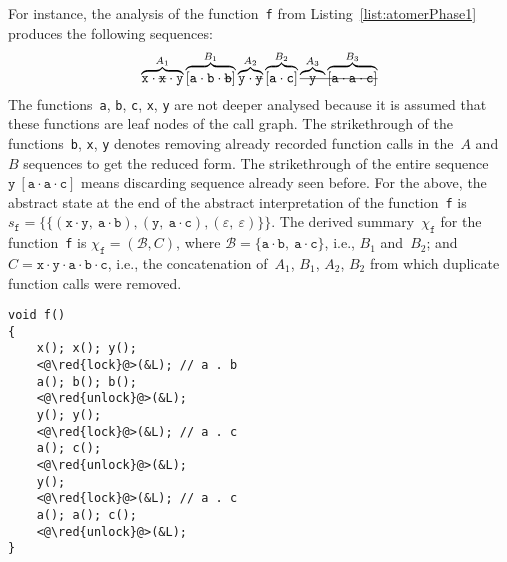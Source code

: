 \begin{example}
    For instance, the analysis of the function~\texttt{f} from Listing~\ref{list:atomerPhase1} produces the following sequences:
    $$
        \overbrace{\mathtt{x} \cdot \text{\texttt{\sout{x}}} \cdot \mathtt{y}}^{A_1} \overbrace{[\mathtt{a} \cdot \mathtt{b} \cdot \text{\texttt{\sout{b}}}]}^{B_1}
        \overbrace{\mathtt{y} \cdot \text{\texttt{\sout{y}}}}^{A_2} \overbrace{[\mathtt{a} \cdot \mathtt{c}]}^{B_2}
        \text{\sout{\ensuremath{\overbrace{\mathtt{y}}^{A_3} \overbrace{[\mathtt{a} \cdot \mathtt{a} \cdot \mathtt{c}]}^{B_3}}}}
    $$
    The functions~\texttt{a}, \texttt{b}, \texttt{c}, \texttt{x}, \texttt{y} are not deeper analysed because it is assumed that these functions are leaf nodes of the call graph. The strikethrough of the functions~\texttt{b}, \texttt{x}, \texttt{y} denotes removing already recorded function calls in the~$ A $ and~$ B $ sequences to get the reduced form. The strikethrough of the entire sequence $ \mathtt{y}\ [\mathtt{a} \cdot \mathtt{a} \cdot \mathtt{c}] $ means discarding sequence already seen before. For the above, the abstract state at the end of the abstract interpretation of the function~\texttt{f} is $ s_\mathtt{f} = \{\{(\mathtt{x} \cdot \mathtt{y},\ \mathtt{a} \cdot \mathtt{b}), (\mathtt{y},\ \mathtt{a} \cdot \mathtt{c}), (\varepsilon,\ \varepsilon)\}\} $. The derived summary~$ \chi_\mathtt{f} $ for the function~\texttt{f} is $ \chi_\mathtt{f} = (\mathcal{B}, C) $, where $ \mathcal{B} = \{\mathtt{a} \cdot \mathtt{b},\ \mathtt{a} \cdot \mathtt{c}\} $, i.e., $ B_1 $ and~$ B_2 $; and $ C = \mathtt{x} \cdot \mathtt{y} \cdot \mathtt{a} \cdot \mathtt{b} \cdot \mathtt{c} $, i.e., the concatenation of~$ A_1 $, $ B_1 $, $ A_2 $, $ B_2 $ from which duplicate function calls were removed.
\end{example}

\begin{lstlisting}[style=c, label={list:atomerPhase1}, float=hbt, caption={A~code snippet used for an illustration of the derivation of \emph{sequences of functions called atomically}}]
void f()
{
    x(); x(); y();
    <@\red{lock}@>(&L); // a . b
    a(); b(); b();
    <@\red{unlock}@>(&L);
    y(); y();
    <@\red{lock}@>(&L); // a . c
    a(); c();
    <@\red{unlock}@>(&L);
    y();
    <@\red{lock}@>(&L); // a . c
    a(); a(); c();
    <@\red{unlock}@>(&L);
}
\end{lstlisting}

